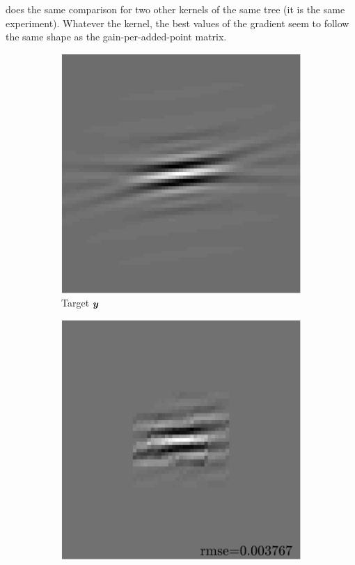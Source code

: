  does the same comparison for two other kernels of the same tree (it is the same experiment). Whatever the kernel, the best values of the gradient seem to follow the same shape as the gain-per-added-point matrix. 

\begin{figure}[!ht]\centering
	\begin{subfigure}[b]{0.22\textwidth}\centering
	\includegraphics[width=\textwidth]{figures/xp/tilted_n4/xp_128x128_sc2_angl4_K3_S3_node4_target.pdf}
	\caption{Target $\bm{y}$}
	\end{subfigure}
	\begin{subfigure}[b]{0.22\textwidth}\centering
	\includegraphics[width=\textwidth]{figures/xp/tilted_n4/xp_128x128_sc2_angl4_K3_S3_node4_approx.pdf}

\end{subfigure}
\end{figure}
